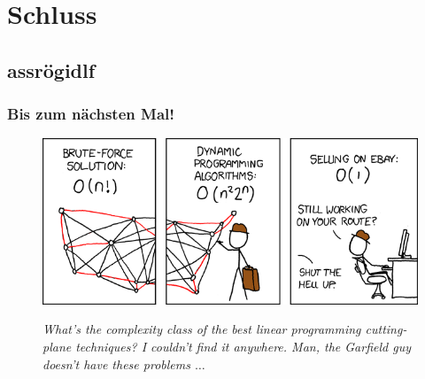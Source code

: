 \section{Schluss}
\subsection{assrögidlf}

\begin{frame}
	\frametitle{Bis zum nächsten Mal!}
	
	\begin{figure}[H]
		\includegraphics[width= \textwidth]{images/399_traveling_salesman}
		
		\textit{\scriptsize{What's the complexity class of the best linear programming cutting-plane techniques? I couldn't find it anywhere. Man, the Garfield guy doesn't have these problems $\ldots$}}
	\end{figure}
\end{frame}


